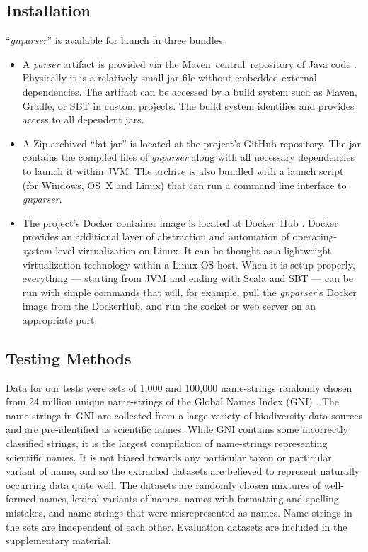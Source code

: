 \documentclass{bmcart}
\begin{document}
\subsection*{Installation}

``\textit{gnparser}'' is available for launch in three bundles.

\begin{itemize} \item A \textit{parser} artifact is provided via the Maven~central~repository of Java code \cite{maven-globalnames}. Physically it is a relatively small jar file without embedded external dependencies. The artifact can be accessed by a build system such as Maven, Gradle, or SBT in custom projects. The build system identifies and provides access to all dependent jars.

  \item A Zip-archived ``fat jar'' is located at the project's GitHub repository. The jar contains the compiled files of \textit{gnparser} along with all necessary dependencies to launch it within JVM\@. The archive is also bundled with a launch script (for Windows, OS~X and Linux) that can run a command line interface to \textit{gnparser}.

  \item The project's Docker container image is located at Docker~Hub \cite{gnparser-docker}. Docker provides an additional layer of abstraction and automation of operating-system-level virtualization on Linux. It can be thought as a lightweight virtualization technology within a Linux OS host.  When it is setup properly, everything --- starting from JVM and ending with Scala and SBT --- can be run with simple commands that will, for example, pull the \textit{gnparser}'s Docker image from the DockerHub, and run the socket or web server on an appropriate port.

\end{itemize}

\subsection*{Testing Methods}

Data for our tests were sets of 1,000 and 100,000 name-strings randomly chosen from 24 million unique name-strings of the Global Names Index (GNI) \cite{gn:index}. The name-strings in GNI are collected from a large variety of biodiversity data sources and are pre-identified as scientific names. While GNI contains some incorrectly classified strings, it is the largest compilation of name-strings representing scientific names. It is not biased towards any particular taxon or particular variant of name, and so the extracted datasets are believed to represent naturally occurring data quite well. The datasets are randomly chosen mixtures of well-formed names, lexical variants of names, names with formatting and spelling mistakes, and name-strings that were misrepresented as names. Name-strings in the sets are independent of each other. Evaluation datasets are included in the supplementary material.
\end{document}

